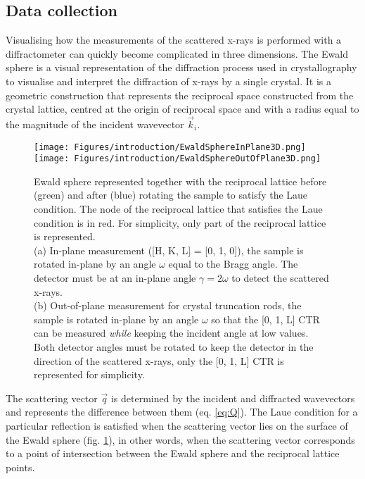 \subsection{Data collection} \label{sec:DataCollectionSXRD}

Visualising how the measurements of the scattered x-rays is performed with a diffractometer can quickly become complicated in three dimensions.
The Ewald sphere is a visual representation of the diffraction process used in crystallography to visualise and interpret the diffraction of x-rays by a single crystal.
It is a geometric construction that represents the reciprocal space constructed from  the crystal lattice, centred at the origin of reciprocal space and with a radius equal to the magnitude of the incident wavevector $\vec{k}_i$.

\begin{figure}[!htb]
    \centering
    \texttt{[image: Figures/introduction/EwaldSphereInPlane3D.png]}
    \texttt{[image: Figures/introduction/EwaldSphereOutOfPlane3D.png]}
    \caption{
    Ewald sphere represented together with the reciprocal lattice before (green) and after (blue) rotating the sample to satisfy the Laue condition.
    The node of the reciprocal lattice that satisfies the Laue condition is in red.
    For simplicity, only part of the reciprocal lattice is represented.\\
    (a) In-plane measurement ([H, K, L] = [0, 1, 0]), the sample is rotated in-plane by an angle $\omega$ equal to the Bragg angle.
    The detector must be at an in-plane angle $\gamma=2\omega$ to detect the scattered x-rays.\\
    (b) Out-of-plane measurement for crystal truncation rods, the sample is rotated in-plane by an angle $\omega$ so that the [0, 1, L] CTR can be measured \textit{while} keeping the incident angle at low values.
    Both detector angles must be rotated to keep the detector in the direction of the scattered x-rays, only the [0, 1, L] CTR is represented for simplicity.
    }
    \label{fig:EwaldSphere}
\end{figure}

The scattering vector $\vec{q}$ is determined by the incident and diffracted wavevectors and represents the difference between them (eq. \ref{eq:Q}).
The Laue condition for a particular reflection is satisfied when the scattering vector lies on the surface of the Ewald sphere (fig. \ref{fig:EwaldSphere}), in other words, when the scattering vector corresponds to a point of intersection between the Ewald sphere and the reciprocal lattice points.

